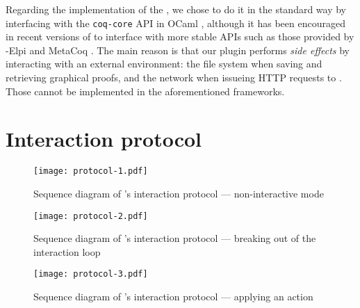 Regarding the implementation of the , we chose to do it in the
standard way by interfacing with the \texttt{coq-core} API in OCaml
, although it has been encouraged in recent versions of  to
interface with more stable APIs such as those provided by -Elpi
 and MetaCoq . The main
reason is that our plugin performs \emph{side effects} by interacting with an
external environment: the file system when saving and retrieving graphical
proofs, and the network when issueing HTTP requests to . Those cannot be
implemented in the aforementioned frameworks.

\section{Interaction protocol}

\begin{figure*}
  \texttt{[image: protocol-1.pdf]}
  \vspace{2em}
  \caption{Sequence diagram of 's interaction protocol ---
  non-interactive mode}
\end{figure*}

\begin{figure*}
  \texttt{[image: protocol-2.pdf]}
  \vspace{2em}
  \caption{Sequence diagram of 's interaction protocol ---
    breaking out of the interaction loop}
\end{figure*}

\begin{figure*}
  \texttt{[image: protocol-3.pdf]}
  \vspace{2em}
  \caption{Sequence diagram of 's interaction protocol ---
    applying an action}
\end{figure*}

